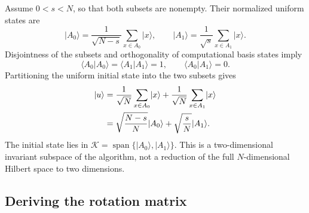 \documentclass[11pt,oneside,openany]{book}
\providecommand{\ket}{}
\renewcommand{\ket}[1]{\lvert #1\rangle}
\providecommand{\braket}{}
\renewcommand{\braket}[2]{\langle #1\vert #2\rangle}
\DeclareMathOperator{\Span}{span}
\theoremstyle{definition}
\begin{document}
Assume $0<s<N$, so that both subsets are nonempty. Their normalized uniform states are
\begin{equation}
 \ket{A_0}=\frac1{\sqrt{N-s}}\sum_{x\in A_0}\ket x,
 \qquad
 \ket{A_1}=\frac1{\sqrt s}\sum_{x\in A_1}\ket x.
 \label{eq:search-two-states}
\end{equation}
Disjointness of the subsets and orthogonality of computational basis states imply
\begin{equation}
 \braket{A_0}{A_0}=\braket{A_1}{A_1}=1,
 \qquad\braket{A_0}{A_1}=0.
\end{equation}
Partitioning the uniform initial state into the two subsets gives
\begin{align}
 \ket u
 &=\frac1{\sqrt N}\sum_{x\in A_0}\ket x
   +\frac1{\sqrt N}\sum_{x\in A_1}\ket x\notag\\
 &=\sqrt{\frac{N-s}{N}}\ket{A_0}
   +\sqrt{\frac sN}\ket{A_1}.
 \label{eq:search-u-components}
\end{align}
The initial state lies in $\mathcal K=\Span\{\ket{A_0},\ket{A_1}\}$. This is a two-dimensional invariant subspace of the algorithm, not a reduction of the full $N$-dimensional Hilbert space to two dimensions.

\subsection{Deriving the rotation matrix}
\end{document}
